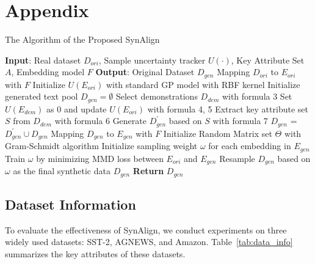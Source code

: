 


\section{Appendix}

\begin{algorithm}[bp]
	\caption{The Algorithm of the Proposed SynAlign} 
	\label{apdx:alg} 
	\begin{algorithmic}
		\STATE \textbf{Input}: Real dataset $D_{ori}$, Sample uncertainty tracker $U(\cdot)$, Key Attribute Set $A$, Embedding model $F$
		\STATE \textbf{Output}: Original Dataset $D_{gen}$
		\STATE Mapping $D_{ori}$ to $E_{ori}$ with $F$
		\STATE Initialize $U(E_{ori})$ with standard GP model with RBF kernel 
		\STATE Initialize generated text pool $D_{gen}=\emptyset$
		\STATE Select demonstrations $D_{dem}$ with formula 3
		\STATE Set $U(E_{dem})$ as 0 and update $U(E_{ori})$ with formula 4, 5
		\STATE Extract key attribute set $S$ from $D_{dem}$ with formula 6
		\STATE Generate $D_{gen}^{'}$ based on $S$ with formula 7
		\STATE $D_{gen}$ = $D_{gen}^{'}\cup D_{gen}$     
		\ENDWHILE 
		\STATE Mapping $D_{gen}$ to $E_{gen}$ with $F$
		\STATE Initialize Random Matrix set $\Theta$ with Gram-Schmidt algorithm
		\STATE Initialize sampling weight $\omega$ for each embedding in $E_{gen}$
		\STATE Train $\omega$ by minimizing MMD loss between $E_{ori}$ and $E_{gen}$
		\STATE Resample $D_{gen}$ based on $\omega$ as the final synthetic data $D_{gen}$
		\STATE \textbf{Return} $D_{gen}$
	\end{algorithmic} 
	\label{alg1}
\end{algorithm}
\vspace*{-0.5cm}

\subsection{Dataset Information}
\label{apdx:data_info}

To evaluate the effectiveness of SynAlign, we conduct experiments on three widely used datasets: SST-2, AGNEWS, and Amazon. Table~\ref{tab:data_info} summarizes the key attributes of these datasets.


